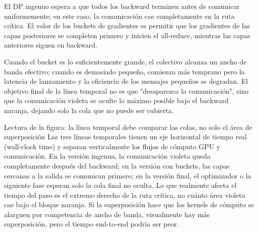 El DP ingenuo espera a que todos los backward terminen antes de comunicar uniformemente; en este caso, la comunicación cae completamente en la ruta crítica. El valor de los buckets de gradientes es permitir que los gradientes de las capas posteriores se completen primero y inicien el all-reduce, mientras las capas anteriores siguen en backward.



Cuando el bucket es lo suficientemente grande, el colectivo alcanza un ancho de banda efectivo; cuando es demasiado pequeño, comienza más temprano pero la latencia de lanzamiento y la eficiencia de los mensajes pequeños se degradan. El objetivo final de la línea temporal no es que "desaparezca la comunicación", sino que la comunicación violeta se oculte lo máximo posible bajo el backward naranja, dejando solo la cola que no puede ser cubierta.


\begin{knowledgebox}{Lectura de la figura: la línea temporal debe comparar las colas, no solo el área de superposición}
Las tres líneas temporales tienen un eje horizontal de tiempo real (wall-clock time) y separan verticalmente los flujos de cómputo GPU y comunicación. En la versión ingenua, la comunicación violeta queda completamente después del backward; en la versión con buckets, las capas cercanas a la salida se comunican primero; en la versión final, el optimizador o la siguiente fase esperan solo la cola final no oculta. Lo que realmente afecta el tiempo del paso es el extremo derecho de la ruta crítica, no cuánto área violeta cae bajo el bloque naranja. Si la superposición hace que los kernels de cómputo se alarguen por competencia de ancho de banda, visualmente hay más superposición, pero el tiempo end-to-end podría ser peor.
\end{knowledgebox}


